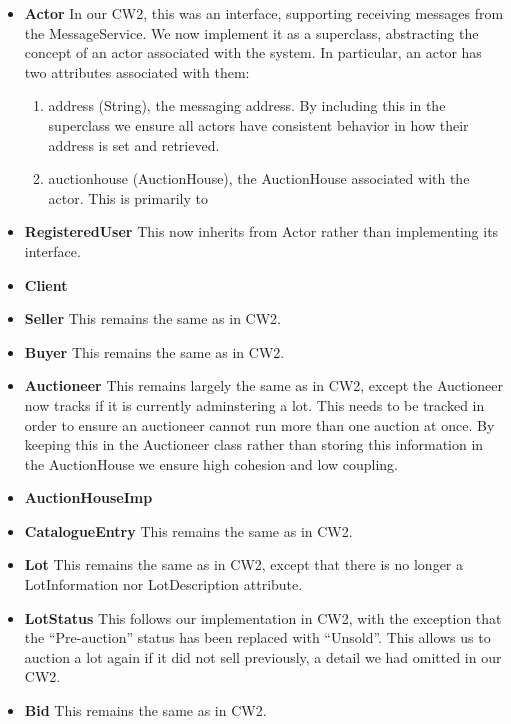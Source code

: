 \documentclass[titlepage, 12pt]{extarticle}
\begin{document}
\begin{itemize}
\item {\bf Actor} In our CW2, this was an interface, supporting receiving messages from the MessageService. We now implement it as a superclass, abstracting the concept of an actor associated with the system. In particular, an actor has two attributes associated with them:
  \begin{enumerate}
    \item address (String), the messaging address. By including this in the superclass we ensure all actors have consistent behavior in how their address is set and retrieved.
    \item auctionhouse (AuctionHouse), the AuctionHouse associated with the actor. This is primarily to 
  \end{enumerate}
\item {\bf RegisteredUser} This now inherits from Actor rather than implementing its interface. 
\item {\bf Client} 
\item {\bf Seller} This remains the same as in CW2. 
\item {\bf Buyer} This remains the same as in CW2. 
\item {\bf Auctioneer} This remains largely the same as in CW2, except the Auctioneer now tracks if it is currently adminstering a lot. This needs to be tracked in order to ensure an auctioneer cannot run more than one auction at once. By keeping this in the Auctioneer class rather than storing this information in the AuctionHouse we ensure high cohesion and low coupling.
\item {\bf AuctionHouseImp} 
\item {\bf CatalogueEntry} This remains the same as in CW2.
\item {\bf Lot} This remains the same as in CW2, except that there is no longer a LotInformation nor LotDescription attribute. 
\item {\bf LotStatus} This follows our implementation in CW2, with the exception that the ``Pre-auction'' status has been replaced with ``Unsold''. This allows us to auction a lot again if it did not sell previously, a detail we had omitted in our CW2. 
\item {\bf Bid} This remains the same as in CW2.
\end{itemize}
\end{document}
